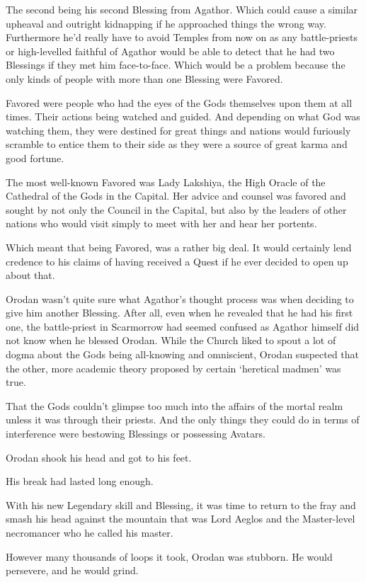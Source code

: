 \documentclass[a4paper,10pt]{book}
\begin{document}
The second being his second Blessing from Agathor. Which could cause a similar upheaval and outright kidnapping if he approached things the wrong way. Furthermore he’d really have to avoid Temples from now on as any battle-priests or high-levelled faithful of Agathor would be able to detect that he had two Blessings if they met him face-to-face. Which would be a problem because the only kinds of people with more than one Blessing were Favored.\par
Favored were people who had the eyes of the Gods themselves upon them at all times. Their actions being watched and guided. And depending on what God was watching them, they were destined for great things and nations would furiously scramble to entice them to their side as they were a source of great karma and good fortune.\par
The most well-known Favored was Lady Lakshiya, the High Oracle of the Cathedral of the Gods in the Capital. Her advice and counsel was favored and sought by not only the Council in the Capital, but also by the leaders of other nations who would visit simply to meet with her and hear her portents.\par
Which meant that being Favored, was a rather big deal. It would certainly lend credence to his claims of having received a Quest if he ever decided to open up about that.\par
Orodan wasn’t quite sure what Agathor’s thought process was when deciding to give him another Blessing. After all, even when he revealed that he had his first one, the battle-priest in Scarmorrow had seemed confused as Agathor himself did not know when he blessed Orodan. While the Church liked to spout a lot of dogma about the Gods being all-knowing and omniscient, Orodan suspected that the other, more academic theory proposed by certain ‘heretical madmen’ was true.\par
That the Gods couldn’t glimpse too much into the affairs of the mortal realm unless it was through their priests. And the only things they could do in terms of interference were bestowing Blessings or possessing Avatars.\par
Orodan shook his head and got to his feet.\par
His break had lasted long enough.\par
With his new Legendary skill and Blessing, it was time to return to the fray and smash his head against the mountain that was Lord Aeglos and the Master-level necromancer who he called his master.\par
However many thousands of loops it took, Orodan was stubborn. He would persevere, and he would grind.\par
\end{document}
